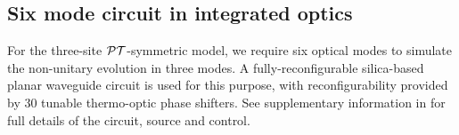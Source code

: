 \subsection{Six mode circuit in integrated optics}
For the three-site \(\mathcal{PT}\)-symmetric model, we require six optical modes to
simulate the non-unitary evolution in three modes. A fully-reconfigurable
silica-based planar waveguide circuit is used for this purpose, with
reconfigurability provided by 30 tunable thermo-optic phase shifters. See
supplementary information in \cite{bigreck} for full details of the circuit,
source and control.


